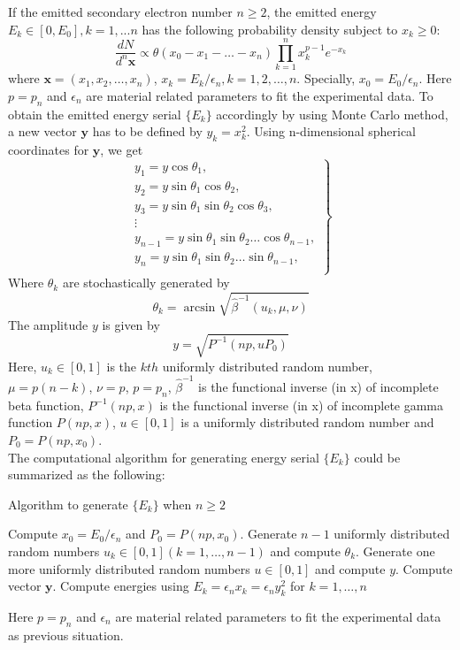 \documentclass[a4paper,11pt]{article}
\begin{document}
If the emitted secondary electron number $n \geq 2$, the emitted energy $E_k \in [0,E_0], k = 1,...n$ has the following probability density subject to $x_k \geq 0$:
\begin{equation*}
\frac{dN}{d^n\mathbf{x}} \propto \theta(x_0 - x_1 - \ldots - x_n)\prod_{k=1}^nx_k^{p-1}e^{-x_k} 
\end{equation*}
where $\mathbf{x} = (x_1,x_2,\ldots,x_n)$, $x_k = E_k/\epsilon_n, k = 1,2,\ldots,n$. Specially, $x_0 = E_0/\epsilon_n$. Here $p = p_n$ and $\epsilon_n$ are material related parameters to fit the experimental data. To obtain the emitted energy serial $\{E_k\}$ accordingly by using Monte Carlo method, a new vector $\mathbf{y}$ has to be defined by $y_k = x_k^2$. Using n-dimensional spherical coordinates for $\mathbf{y}$, we get
\begin{equation*}
\left. \begin{array}{c}
y_1 = y\cos{\theta_1},\\
y_2 = y\sin{\theta_1}\cos{\theta_2},\\
y_3 = y\sin{\theta_1}\sin{\theta_2}\cos{\theta_3},\\
\vdots\\
y_{n-1} = y\sin{\theta_1}\sin{\theta_2}\ldots\cos{\theta_{n-1}},\\
y_{n} = y\sin{\theta_1}\sin{\theta_2}\ldots\sin{\theta_{n-1}},\\
\end{array} \right\}
\end{equation*}
Where $\theta_k$ are stochastically generated by 
\begin{equation*}
\theta_k = \arcsin{\sqrt{\hat{\beta}^{-1}(u_k,\mu,\nu)}}
\end{equation*}
The amplitude $y$ is given by
\begin{equation*}
y = \sqrt{P^{-1}(np,uP_0)}
\end{equation*}
Here, $u_k \in [0,1]$ is the $k th$ uniformly distributed random number, $\mu = p(n-k)$, $\nu = p$, $p = p_n$, $\hat{\beta}^{-1}$ is the functional inverse (in x) of incomplete beta function, $P^{-1}(np,x)$ is the functional inverse (in x) of incomplete gamma function $P(np,x)$, $u \in [0,1]$ is a uniformly distributed random number and $P_0 = P(np,x_0)$.\\

The computational algorithm for generating energy serial $\{E_k\}$ could be summarized as the following:
\begin{algorithm}[H]
   \caption{Algorithm to generate $\{E_k\}$ when $n \geq 2$} \label{alg:ge2_algo}
   \begin{algorithmic}[1]
     \STATE Compute $x_0 = E_0/ \epsilon_n$ and $P_0 = P(np,x_0)$.
     \STATE Generate $n-1$ uniformly distributed random numbers $u_k \in [0,1] (k = 1,\ldots,n-1)$ and compute $\theta_k$.
     \STATE Generate one more uniformly distributed random numbers $u \in [0,1]$ and compute $y$.
     \STATE Compute vector $\mathbf{y}$.
     \STATE Compute energies using $E_k = \epsilon_nx_k = \epsilon_ny_k^2$ for $k = 1,\ldots,n$
   \end{algorithmic}
 \end{algorithm}
Here $p = p_n$ and $\epsilon_n$ are material related parameters to fit the experimental data as previous situation. 
\end{document}
